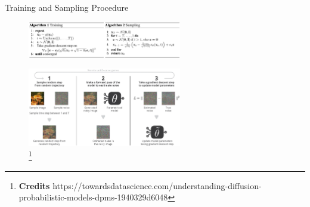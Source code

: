 \documentclass[aspectratio=169, 10pt]{beamer}
\theoremstyle{definition}
\begin{document}
\begin{frame}{Training and Sampling Procedure}
  \begin{figure}[h!]
    \centering
    \includegraphics[width=0.6\textwidth]{./pic/ho_algo.png}
  \end{figure}
  \begin{figure}[h]
    \centering
    \includegraphics[width=0.60\textwidth]{./pic/ho_training.png}
    \caption{\footnote{\textbf{Credits}
    https://towardsdatascience.com/understanding-diffusion-probabilistic-models-dpms-1940329d6048}}
  \end{figure}
\end{frame}
\end{document}
